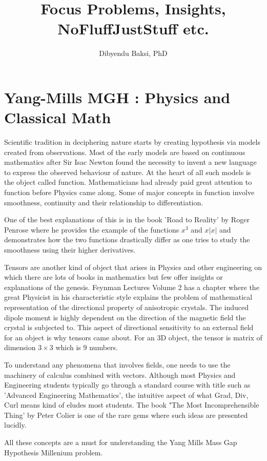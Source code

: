 \documentclass[11pt]{amsart}
\title{Focus Problems, Insights, NoFluffJustStuff etc.}
\author{Dibyendu Baksi, PhD}
\date{}                                           %
\begin{document}
\maketitle
\section{Yang-Mills MGH : Physics and Classical Math}
Scientific tradition in deciphering nature starts by creating hypothesis via models created from observations. Most of the early models are based on continuous mathematics after Sir Isac Newton found the necessity to invent a new language to express the observed behaviour of nature. At the heart of all such models is the object called function. Mathematicians had already paid great attention to function before Physics came along. Some of major concepts in function involve smoothness, continuity and their relationship to differentiation. 

One of the best explanations of this is in the book 'Road to Reality' by Roger Penrose where he provides the example of the functions $x^3$ and $x |x|$ and demonstrates how the two functions drastically differ as one tries to study the smoothness using their higher derivatives.

Tensors are another kind of object that arises in Physics and other engineering on which there are lots of books in mathematics but few offer insights or explanations of the genesis. Feynman Lectures Volume 2 has a chapter where the great Physicist in his characteristic style explains the problem of mathematical representation of the directional property of anisotropic crystals. The induced dipole moment is highly dependent on the direction of the magnetic field the crystal is subjected to. This aspect of directional sensitivity to an external field for an object is why tensors came about. For an 3D object, the tensor is matrix of dimension $3 \times 3$ which is 9 numbers. 

To understand any phenomena that involves fields, one needs to use the machinery of calculus combined with vectors. Although most Physics and Engineering students typically go through a standard course with title such as 'Advanced Engineering Mathematics', the intuitive aspect of what Grad, Div, Curl means kind of eludes most students. The book "The Most Incomprehensible Thing' by Peter Colier is one of the rare gems where such ideas are presented lucidly.

All these concepts are a must for understanding the Yang Mills Mass Gap Hypothesis Millenium problem. 
\end{document}
